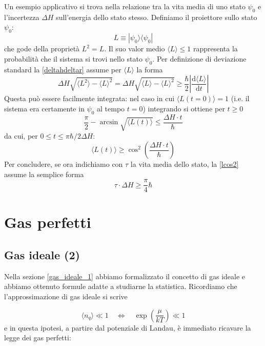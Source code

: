 \documentclass[a4paper]{report}
\begin{document}
Un esempio applicativo si trova nella relazione tra la vita media di uno stato $\psi_0$ e l'incertezza $\Delta H$ sull'energia dello stato stesso. Definiamo il proiettore sullo stato $\psi_0$:
\begin{equation}
    L \equiv |\psi_0\rangle\langle\psi_0|
\end{equation}
che gode della proprietà $L^2 = L$. Il suo valor medio $\langle L \rangle \leq 1$ rappresenta la probabilità che il sistema si trovi nello stato $\psi_0$. Per definizione di deviazione standard la \eqref{deltahdeltar} assume per $\langle L \rangle$ la forma
\begin{equation}
    \Delta H \sqrt{\langle L^2 \rangle - \langle L \rangle^2} = \Delta H \sqrt{\langle L \rangle - \langle L \rangle^2} \geq \frac{\hbar}{2} \left|\frac{\mathrm{d}\langle L\rangle}{\mathrm{d}t}\right|
\end{equation}
Questa può essere facilmente integrata: nel caso in cui $\langle L(t = 0) \rangle = 1$ (i.e. il sistema era certamente in $\psi_0$ al tempo $t = 0$) integrando si ottiene per $t \geq 0$
\begin{equation}
    \frac{\pi}{2} - \arcsin\sqrt{\langle L(t) \rangle}  \leq \frac{\Delta H\cdot t}{\hbar}
\end{equation}
da cui, per $0\leq t\leq \pi \hbar/2\Delta H$:
\begin{equation}
    \langle L(t) \rangle \geq \cos^2\left(\frac{\Delta H \cdot t}{\hbar}\right)
    \label{lcos2}
\end{equation}
Per concludere, se ora indichiamo con $\tau$ la vita media dello stato, la \eqref{lcos2} assume la semplice forma
\begin{equation}
    \tau \cdot \Delta H \geq \frac{\pi}{4}\hbar 
\end{equation}

\chapter{Gas perfetti}

\section{Gas ideale (2)}

Nella sezione \ref{gas_ideale_1} abbiamo formalizzato il concetto di gas ideale e abbiamo ottenuto formule adatte a studiarne la statistica. Ricordiamo che l'approssimazione di gas ideale si scrive

\begin{equation}
    \langle n_q \rangle \ll 1 \quad \iff \quad \exp\left(\frac{\mu}{k T}\right) \ll 1
\end{equation}
e in questa ipotesi, a partire dal potenziale di Landau, è immediato ricavare la legge dei gas perfetti:
\end{document}
